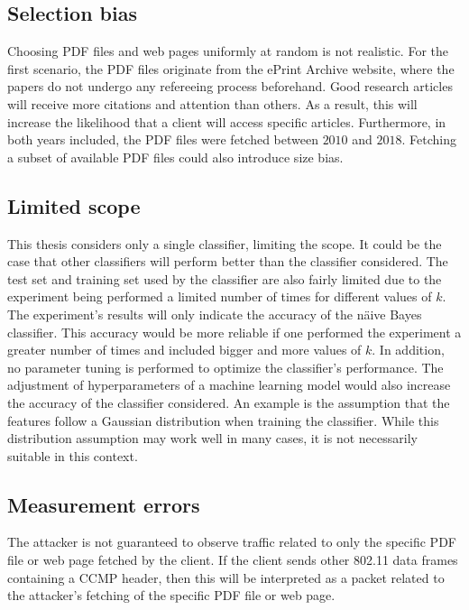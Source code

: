 \subsection{Selection bias\label{subsec:bias-methodology}}

Choosing PDF files and web pages uniformly at random is not realistic. For the first scenario, the PDF files originate from the ePrint Archive website, where the papers do not undergo any refereeing process beforehand. Good research articles will receive more citations and attention than others. As a result, this will increase the likelihood that a client will access specific articles. Furthermore, in both years included, the PDF files were fetched between $2010$ and $2018$. Fetching a subset of available PDF files could also introduce size bias.

\subsection{Limited scope\label{subsec:scope-methodology}}

This thesis considers only a single classifier, limiting the scope. It could be the case that other classifiers will perform better than the classifier considered. The test set and training set used by the classifier are also fairly limited due to the experiment being performed a limited number of times for different values of $k$. The experiment's results will only indicate the accuracy of the näive Bayes classifier. This accuracy would be more reliable if one performed the experiment a greater number of times and included bigger and more values of $k$. In addition, no parameter tuning is performed to optimize the classifier's performance. The adjustment of hyperparameters of a machine learning model would also increase the accuracy of the classifier considered. An example is the assumption that the features follow a Gaussian distribution when training the classifier. While this distribution assumption may work well in many cases, it is not necessarily suitable in this context. 

\subsection{Measurement errors\label{subsec:measurement-methodology}}

The attacker is not guaranteed to observe traffic related to only the specific PDF file or web page fetched by the client. If the client sends other 802.11 data frames containing a CCMP header, then this will be interpreted as a packet related to the attacker's fetching of the specific PDF file or web page.


